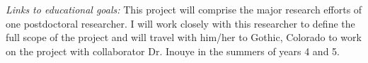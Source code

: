 \documentclass[11pt,a4paper]{article}
\begin{document}
\emph {Links to educational goals:} This project will comprise the major research efforts of one postdoctoral researcher. I will work closely with this researcher to define the full scope of the project and will travel with him/her to Gothic, Colorado to work on the project with collaborator Dr. Inouye in the summers of years 4 and 5.


\end{document}
